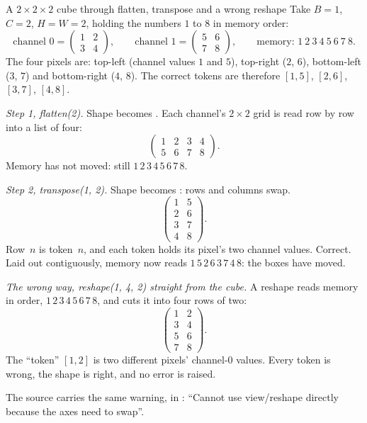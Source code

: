 \begin{worked}[label={we:shapes:layout}]{A $2\times2\times2$ cube through flatten, transpose and a wrong reshape}
Take $B=1$, $C=2$, $H=W=2$, holding the numbers $1$ to $8$ in memory order:
\[
\text{channel 0} = \begin{pmatrix}1&2\\3&4\end{pmatrix},\qquad
\text{channel 1} = \begin{pmatrix}5&6\\7&8\end{pmatrix},\qquad
\text{memory: } 1\ 2\ 3\ 4\ 5\ 6\ 7\ 8 .
\]
The four pixels are: top-left (channel values $1$ and $5$), top-right ($2$, $6$), bottom-left ($3$,
$7$) and bottom-right ($4$, $8$). The correct tokens are therefore $[1,5]$, $[2,6]$, $[3,7]$, $[4,8]$.

\emph{Step 1, flatten(2).} Shape  becomes . Each channel's
$2\times2$ grid is read row by row into a list of four:
\[
\begin{pmatrix}1&2&3&4\\5&6&7&8\end{pmatrix}.
\]
Memory has not moved: still $1\,2\,3\,4\,5\,6\,7\,8$.

\emph{Step 2, transpose(1, 2).} Shape  becomes : rows and columns
swap.
\[
\begin{pmatrix}1&5\\2&6\\3&7\\4&8\end{pmatrix}.
\]
Row~$n$ is token~$n$, and each token holds its pixel's two channel values. Correct. Laid out
contiguously, memory now reads $1\,5\,2\,6\,3\,7\,4\,8$: the boxes have moved.

\emph{The wrong way, reshape(1, 4, 2) straight from the cube.} A reshape reads memory in order,
$1\,2\,3\,4\,5\,6\,7\,8$, and cuts it into four rows of two:
\[
\begin{pmatrix}1&2\\3&4\\5&6\\7&8\end{pmatrix}.
\]
The ``token'' $[1,2]$ is two different pixels' channel-0 values. Every token is wrong, the shape is
right, and no error is raised.
\end{worked}

The source carries the same warning, in :
``Cannot use view/reshape directly because the axes need to swap''.

